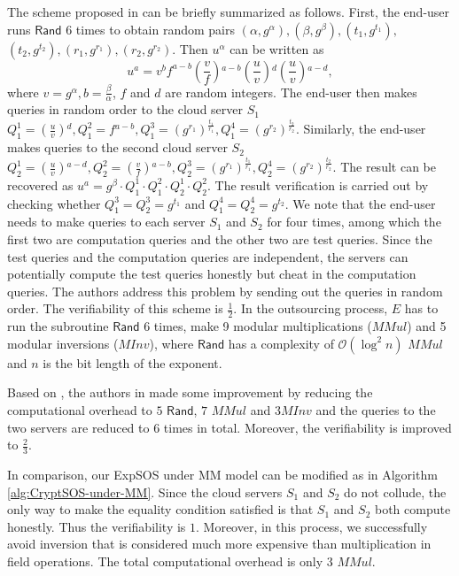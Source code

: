 \documentclass[english,draftcls,onecolumn,11pt]{IEEEtran}
\theoremstyle{definition}
\theoremstyle{plain}
\theoremstyle{plain}
\theoremstyle{definition}
\begin{document}
The scheme proposed in \cite{hohenberger2005securely} can be briefly
summarized as follows. First, the end-user runs $\mathsf{Rand}$ $6$
times to obtain random pairs $(\alpha,g^{\alpha}),(\beta,g^{\beta}),(t_{1},g^{t_{1}}),$
$(t_{2},g^{t_{2}}),(r_{1},g^{r_{1}}),(r_{2},g^{r_{2}})$. Then $u^{\alpha}$
can be written as 
\[
u^{a}=v^{b}f^{a-b}\left(\frac{v}{f}\right){}^{a-b}\left(\frac{u}{v}\right){}^{d}\left(\frac{u}{v}\right){}^{a-d},
\]
where $v=g^{\alpha},b=\frac{\beta}{\alpha}$, $f$ and $d$ are random
integers. The end-user then makes queries in random order to the cloud
server $S_{1}$ $Q_{1}^{1}=\left(\frac{u}{v}\right){}^{d},Q_{1}^{2}=f{}^{a-b},Q_{1}^{3}=\left(g^{r_{1}}\right){}^{\frac{t_{1}}{r_{1}}},Q_{1}^{4}=\left(g^{r_{2}}\right){}^{\frac{t_{2}}{r_{2}}}$.
Similarly, the end-user makes queries to the second cloud server $S_{2}$
$Q_{2}^{1}=\left(\frac{u}{v}\right){}^{a-d},Q_{2}^{2}=\left(\frac{v}{f}\right){}^{a-b},Q_{2}^{3}=\left(g^{r_{1}}\right){}^{\frac{t_{1}}{r_{1}}},Q_{2}^{4}=\left(g^{r_{2}}\right){}^{\frac{t_{2}}{r_{2}}}$.
The result can be recovered as $u^{a}=g^{\beta}\cdot Q_{1}^{1}\cdot Q_{1}^{2}\cdot Q_{2}^{1}\cdot Q_{2}^{2}$.
The result verification is carried out by checking whether $Q_{1}^{3}=Q_{2}^{3}=g^{t_{1}}$
and $Q_{1}^{4}=Q_{2}^{4}=g^{t_{2}}$. We note that the end-user needs
to make queries to each server $S_{1}$ and $S_{2}$ for four times,
among which the first two are computation queries and the other two
are test queries. Since the test queries and the computation queries
are independent, the servers can potentially compute the test queries
honestly but cheat in the computation queries. The authors address
this problem by sending out the queries in random order. The verifiability
of this scheme is $\frac{1}{2}$. In the outsourcing process, $E$
has to run the subroutine $\mathsf{Rand}$ 6 times, make 9 modular
multiplications ($MMul$) and 5 modular inversions ($MInv$), where
$\mathsf{Rand}$ has a complexity of $\mathcal{O}(\log^{2}n)$ $MMul$
and $n$ is the bit length of the exponent.

Based on \cite{hohenberger2005securely}, the authors in \cite{chen2012new}
made some improvement by reducing the computational overhead to $5$
$\mathsf{Rand}$, $7$ $MMul$ and $3$$MInv$ and the queries to
the two servers are reduced to $6$ times in total. Moreover, the
verifiability is improved to $\frac{2}{3}$.

In comparison, our ExpSOS under MM model can be modified as in Algorithm
\ref{alg:CryptSOS-under-MM}. Since the cloud servers $S_{1}$ and
$S_{2}$ do not collude, the only way to make the equality condition
satisfied is that $S_{1}$ and $S_{2}$ both compute honestly. Thus
the verifiability is $1$. Moreover, in this process, we successfully
avoid inversion that is considered much more expensive than multiplication
in field operations. The total computational overhead is only 3 $MMul$. 
\end{document}
